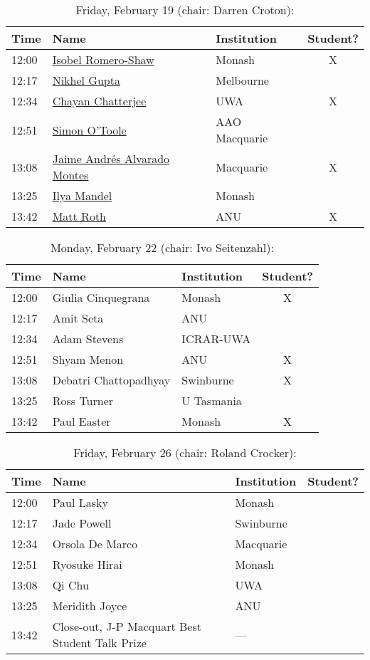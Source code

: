 \documentclass[amsmath,onecolumn]{revtex4-1}
\begin{document}
\begin{table}[!htbp]
	\centering
	\caption{Friday, February 19 (chair: Darren Croton):}
\begin{tabular}{| l | l | l | c |}
	\hline
	Time & Name  & Institution & Student? \\ 		
	\hline
	12:00 & \href{https://forms.gle/QwJvBjKeWbRrQ97m7}{Isobel Romero-Shaw} & Monash & X\\
	12:17 & \href{https://forms.gle/XAmwmEd3dRt7QEjb7}{Nikhel Gupta}  & Melbourne & \\
	12:34 & \href{https://forms.gle/gmpXZ9kMXJKox8GM7}{Chayan Chatterjee} & UWA  & X \\
	12:51 & \href{https://forms.gle/XEyQTWZNqPMGETbu5}{Simon O'Toole} & AAO Macquarie  & \\
	13:08 & \href{https://forms.gle/AEjYKdsjeKiSzeRR6}{Jaime Andr\'{e}s Alvarado Montes} &  Macquarie & X\\
	13:25 & \href{https://forms.gle/sdeWUK3dkFgqULr87}{Ilya Mandel} & Monash & \\
	13:42 & \href{https://forms.gle/6LQ6DTo8L1x8NXCF9}{Matt Roth} & ANU & X\\
	\hline
\end{tabular}
\end{table}

\begin{table}[!htbp]
	\centering
	\caption{Monday, February 22 (chair: Ivo Seitenzahl):}
\begin{tabular}{| l | l | l | c |}
	\hline
	Time & Name  & Institution & Student? \\ 		
	\hline
	12:00 & Giulia	Cinquegrana & Monash & X\\
	12:17 & Amit 	Seta & ANU  & \\
	12:34 & Adam	Stevens & ICRAR-UWA &\\
	12:51 & Shyam	Menon & ANU & X\\
	13:08 & Debatri 	Chattopadhyay & Swinburne  & X \\
	13:25 & Ross	Turner  & U Tasmania  & \\
	13:42 & Paul	Easter & Monash & X\\
	\hline
\end{tabular}
\end{table}

\begin{table}[!htbp]
	\centering
	\caption{Friday, February 26 (chair: Roland Crocker):}
\begin{tabular}{| l | l | l | c |}
	\hline
	Time & Name  & Institution & Student? \\ 		
	\hline
	12:00 & Paul	Lasky & Monash & \\
	12:17 & Jade	Powell & Swinburne & \\
	12:34 & Orsola	De Marco & Macquarie & \\
	12:51 & Ryosuke	Hirai  & Monash & \\
	13:08 & Qi	Chu & UWA & \\
	13:25 & Meridith	Joyce & ANU  & \\
	13:42 & Close-out, J-P Macquart Best Student Talk Prize & --- & \\
	\hline
\end{tabular}
\end{table}
\end{document}
